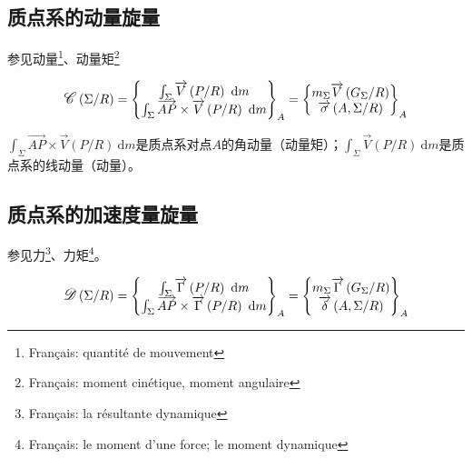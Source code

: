 \documentclass[UTF8]{ctexart}%
\begin{document}
\subsection{质点系的动量旋量}
\label{sec:质点系的动量旋量}
参见动量\footnote{Français: quantité de mouvement}、动量矩\footnote{Français: moment cinétique, moment angulaire}

\begin{equation}
\mathlarger{\mathscr{C}}\left(\Sigma/R\right)=\left\{\begin{matrix}
  \int_{\Sigma}\overrightarrow{V}\left(P/R\right)\ \mathrm{d}m \\
  \int_{\Sigma}\overrightarrow{AP}\times\overrightarrow{V}\left(P/R\right)\ \mathrm{d}m
 \end{matrix} \right\}_A=\left\{\begin{matrix}
	m_{\Sigma}\overrightarrow{V}\left(G_{\Sigma}/R\right)\\
	\overrightarrow{\sigma}\left(A, \Sigma/R\right)
 \end{matrix} \right\}_A
\end{equation}

$\int_{\Sigma}\overrightarrow{AP}\times\overrightarrow{V}\left(P/R\right)\ \mathrm{d}m$是质点系对点$A$的角动量（动量矩）；$\int_{\Sigma}\overrightarrow{V}\left(P/R\right)\ \mathrm{d}m$是质点系的线动量（动量）。

\subsection{质点系的加速度量旋量}
\label{sec:质点系的加速度量旋量}
参见力\footnote{Français: la résultante dynamique}、力矩\footnote{Français: le moment d'une force; le moment dynamique}。

\begin{equation}
\mathlarger{\mathscr{D}}\left(\Sigma/R\right)=\left\{\begin{matrix}
  \int_{\Sigma}\overrightarrow{\Gamma}\left(P/R\right)\ \mathrm{d}m \\
  \int_{\Sigma}\overrightarrow{AP}\times\overrightarrow{\Gamma}\left(P/R\right)\ \mathrm{d}m 
 \end{matrix} \right\}_A=\left\{\begin{matrix}
	m_{\Sigma}\overrightarrow{\Gamma}\left(G_{\Sigma}/R\right)\\
	\overrightarrow{\delta}\left(A, \Sigma/R\right)
 \end{matrix} \right\}_A
\end{equation}
\end{document}
